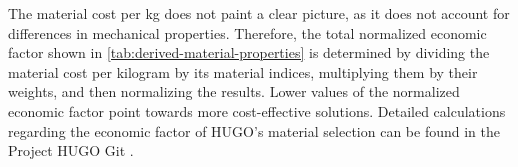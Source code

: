  The material cost per kg does not paint a clear picture, as it does not account for differences in mechanical properties. Therefore, the total normalized economic factor shown in \autoref{tab:derived-material-properties} is determined by dividing the material cost per kilogram by its material indices, multiplying them by their weights, and then normalizing the results.
Lower values of the normalized economic factor point towards more cost-effective solutions. Detailed calculations regarding the economic factor of HUGO's material selection can be found in the Project HUGO Git .






